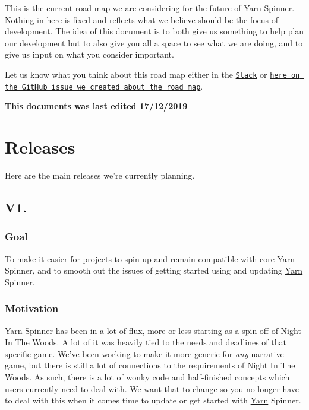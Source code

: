 This is the current road map we are considering for the future of \hyperlink{a00050}{Yarn} Spinner. Nothing in here is fixed and reflects what we believe should be the focus of development. The idea of this document is to both give us something to help plan our development but to also give you all a space to see what we are doing, and to give us input on what you consider important.

Let us know what you think about this road map either in the \href{http://lab.to/narrativegamedev}{\tt Slack} or \href{https://github.com/YarnSpinnerTool/YarnSpinner/issues/183}{\tt here on the Git\-Hub issue we created about the road map}.

{\bfseries This documents was last edited 17/12/2019}

\section*{Releases}

Here are the main releases we're currently planning.

\subsection*{V1.}

\subsubsection*{Goal}

To make it easier for projects to spin up and remain compatible with core \hyperlink{a00050}{Yarn} Spinner, and to smooth out the issues of getting started using and updating \hyperlink{a00050}{Yarn} Spinner.

\subsubsection*{Motivation}

\hyperlink{a00050}{Yarn} Spinner has been in a lot of flux, more or less starting as a spin-\/off of Night In The Woods. A lot of it was heavily tied to the needs and deadlines of that specific game. We've been working to make it more generic for {\itshape any} narrative game, but there is still a lot of connections to the requirements of Night In The Woods. As such, there is a lot of wonky code and half-\/finished concepts which users currently need to deal with. We want that to change so you no longer have to deal with this when it comes time to update or get started with \hyperlink{a00050}{Yarn} Spinner.

